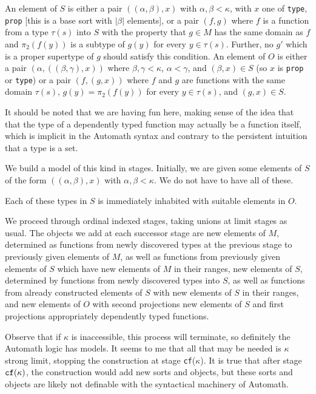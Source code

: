 \documentclass[12pt]{article}
\begin{document}
An element of $S$ is either a pair $((\alpha,\beta),x)$ with $\alpha,\beta<\kappa$, with $x$ one of {\tt type}, {\tt prop} [this is a base sort with $|\beta|$ elements], or a pair $(f,g)$ where $f$ is a function
from a type $\tau(s)$ into $S$ with the property that $g\in M$ has the same domain as $f$ and $\pi_2(f(y))$ is a subtype of $g(y)$ for every $y \in \tau(s)$.  Further,  no $g'$ which is a proper supertype of $g$ should satisfy this condition.
An element of $O$ is either a pair $(\alpha,((\beta,\gamma),x))$ where $ \beta,\gamma<\kappa$, $\alpha<\gamma$, and $(\beta,x) \in S$ (so $x$ is {\tt prop} or {\tt type}) or a pair $(f,(g,x))$
where $f$ and $g$ are functions with the same domain $\tau(s)$, $g(y) = \pi_2(f(y))$ for every $y \in \tau(s)$, and $(g,x) \in S$.

It should be noted that we are having fun here, making sense of the idea that that the type of a dependently typed function may actually be a function itself, which is implicit in the Automath syntax and contrary to the persistent intuition that a type is a set.

We build a model of this kind in stages.  Initially, we are given some elements of $S$ of the form $((\alpha,\beta),x)$ with $\alpha,\beta<\kappa$.  We do not have to have all of these.

Each of these types in $S$ is immediately inhabited with suitable elements in $O$.


We proceed through ordinal indexed stages, taking unions at limit stages as usual.  The objects we add at each successor stage are new elements of $M$, determined as functions from newly discovered types at the previous stage to
previously given elements of $M$, as well as functions from previously given elements of $S$ which have new elements of $M$ in their ranges,  new elements of $S$, determined by functions from newly discovered types into $S$, as well as functions from already constructed elements of $S$ with new elements of $S$ in their ranges, and new elements of $O$ with second projections new elements of $S$ and first projections appropriately dependently typed functions.

Observe that if $\kappa$ is inaccessible, this process will terminate, so definitely the Automath logic has models.   It seems to me that all that may be needed is $\kappa$ strong limit, stopping the construction at stage {\tt cf}($\kappa$).  It is true that after stage ${\tt cf}(\kappa)$, the construction would add new sorts and objects, but these sorts and objects are likely  not definable with the syntactical machinery of Automath.
\end{document}
